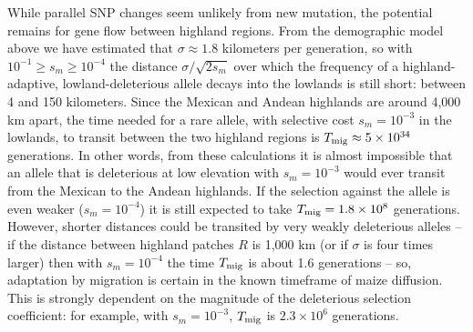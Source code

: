 {{While parallel SNP changes seem unlikely from new mutation, the potential remains for gene flow between highland regions.
From the demographic model above
we have estimated that $\sigma \approx 1.8$ kilometers per generation,
so with $10^{-1} \ge s_m \ge 10^{-4}$ the distance $\sigma/\sqrt{2s_m}$ over which the frequency of 
a highland-adaptive, lowland-deleterious allele decays into the lowlands
is still short: between 4 and 150 kilometers.
Since the Mexican and Andean highlands are around 4,000 km apart,
the time needed for a rare allele, with selective cost $s_m=10^{-3}$ in the lowlands, to transit between the two highland regions
is $T_{\text{mig}} \approx 5 \times 10^{34}$ generations.
In other words, from these calculations it is almost impossible that an allele that is deleterious at low elevation with $s_m=10^{-3}$ 
would ever transit from the Mexican to the Andean highlands.
If the selection against the allele is even weaker ($s_m=10^{-4}$) it is still expected to take $T_{\text{mig}} = 1.8 \times 10^8$ generations.
However, shorter distances could be transited by very weakly deleterious alleles --
if the distance between highland patches $R$ is 1,000 km (or if $\sigma$ is four times larger)
then with $s_m=10^{-4}$ the time $T_{\text{mig}}$ is about 1.6 generations --
so, adaptation by migration is certain in the known timeframe of maize diffusion.
This is strongly dependent on the magnitude of the deleterious selection coefficient: for example,
with $s_m=10^{-3}$, $T_{\text{mig}}$ is $2.3 \times 10^6$ generations.

}}
